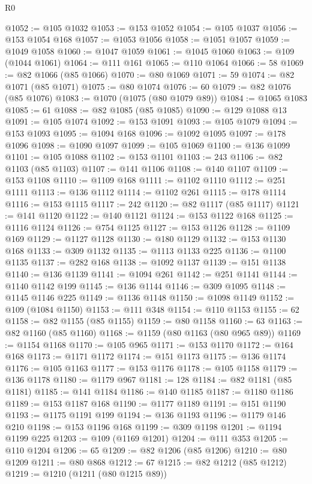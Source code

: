 \begin{lexlean}{R0}
\begin{coremodule}
@1052 := @105 @1032
@1053 := @153 @1052
@1054 := @105 @1037
@1056 := @153 @1054 @168
@1057 := @1053 @1056
@1058 := @1051 @1057
@1059 := @1049 @1058
@1060 := @1047 @1059
@1061 := @1045 @1060
@1063 := @109 (@1044 @1061)
@1064 := @111 @161
@1065 := @110 @1064
@1066 := 58
@1069 := @82 @1066 (@85 @1066)
@1070 := @80 @1069
@1071 := 59
@1074 := @82 @1071 (@85 @1071)
@1075 := @80 @1074
@1076 := 60
@1079 := @82 @1076 (@85 @1076)
@1083 := @1070 (@1075 (@80 @1079 @89))
@1084 := @1065 @1083
@1085 := 61
@1088 := @82 @1085 (@85 @1085)
@1090 := @129 @1088 @13
@1091 := @105 @1074
@1092 := @153 @1091
@1093 := @105 @1079
@1094 := @153 @1093
@1095 := @1094 @168
@1096 := @1092 @1095
@1097 := @178 @1096
@1098 := @1090 @1097
@1099 := @105 @1069
@1100 := @136 @1099
@1101 := @105 @1088
@1102 := @153 @1101
@1103 := 243
@1106 := @82 @1103 (@85 @1103)
@1107 := @141 @1106
@1108 := @140 @1107
@1109 := @153 @1108
@1110 := @1109 @168
@1111 := @1102 @1110
@1112 := @251 @1111
@1113 := @136 @1112
@1114 := @1102 @261
@1115 := @178 @1114
@1116 := @153 @1115
@1117 := 242
@1120 := @82 @1117 (@85 @1117)
@1121 := @141 @1120
@1122 := @140 @1121
@1124 := @153 @1122 @168
@1125 := @1116 @1124
@1126 := @754 @1125
@1127 := @153 @1126
@1128 := @1109 @169
@1129 := @1127 @1128
@1130 := @180 @1129
@1132 := @153 @1130 @168
@1133 := @309 @1132
@1135 := @1113 @1133 @225
@1136 := @1100 @1135
@1137 := @282 @168
@1138 := @1092 @1137
@1139 := @151 @1138
@1140 := @136 @1139
@1141 := @1094 @261
@1142 := @251 @1141
@1144 := @1140 @1142 @199
@1145 := @136 @1144
@1146 := @309 @1095
@1148 := @1145 @1146 @225
@1149 := @1136 @1148
@1150 := @1098 @1149
@1152 := @109 (@1084 @1150)
@1153 := @111 @348
@1154 := @110 @1153
@1155 := 62
@1158 := @82 @1155 (@85 @1155)
@1159 := @80 @1158
@1160 := 63
@1163 := @82 @1160 (@85 @1160)
@1168 := @1159 (@80 @1163 (@80 @965 @89))
@1169 := @1154 @1168
@1170 := @105 @965
@1171 := @153 @1170
@1172 := @164 @168
@1173 := @1171 @1172
@1174 := @151 @1173
@1175 := @136 @1174
@1176 := @105 @1163
@1177 := @153 @1176
@1178 := @105 @1158
@1179 := @136 @1178
@1180 := @1179 @967
@1181 := 128
@1184 := @82 @1181 (@85 @1181)
@1185 := @141 @1184
@1186 := @140 @1185
@1187 := @1180 @1186
@1189 := @153 @1187 @168
@1190 := @1177 @1189
@1191 := @151 @1190
@1193 := @1175 @1191 @199
@1194 := @136 @1193
@1196 := @1179 @146 @210
@1198 := @153 @1196 @168
@1199 := @309 @1198
@1201 := @1194 @1199 @225
@1203 := @109 (@1169 @1201)
@1204 := @111 @353
@1205 := @110 @1204
@1206 := 65
@1209 := @82 @1206 (@85 @1206)
@1210 := @80 @1209
@1211 := @80 @868
@1212 := 67
@1215 := @82 @1212 (@85 @1212)
@1219 := @1210 (@1211 (@80 @1215 @89))

\end{coremodule}
\end{lexlean}
